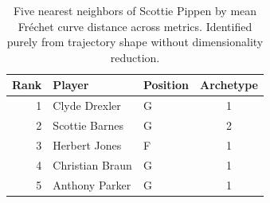 \begin{table}[htbp]
  \centering\small
  \begin{tabular}{rllc}
    \toprule
    Rank & Player & Position & Archetype \\
    \midrule
    1 & Clyde Drexler & G & 1 \\
    2 & Scottie Barnes & G & 2 \\
    3 & Herbert Jones & F & 1 \\
    4 & Christian Braun & G & 1 \\
    5 & Anthony Parker & G & 1 \\
    \bottomrule
  \end{tabular}
  \caption{Five nearest neighbors of Scottie Pippen by mean Fr\'{e}chet curve distance across metrics. Identified purely from trajectory shape without dimensionality reduction.}
  \label{tab:Scottie_Pippen_frechet_curve_neighbors}
\end{table}

